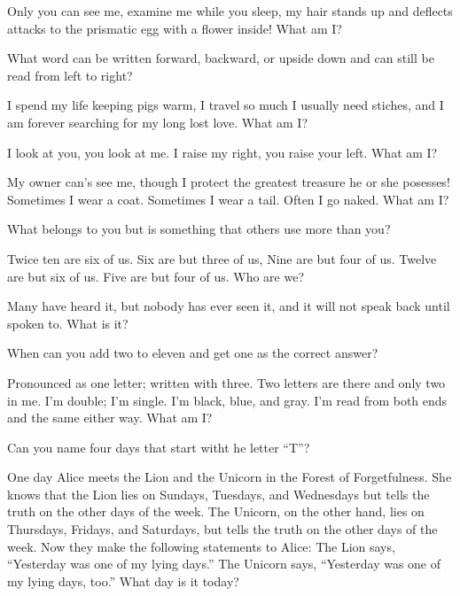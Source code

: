 \documentclass[green]{guildcamp2}
\begin{document}
\begin{enum}
	\item Only you can see me, examine me while you sleep, my hair stands up and deflects attacks to the prismatic egg with a flower inside! What am I?
	
	\item What word can be written forward, backward, or upside down and can still be read from left to right?
	
	\item I spend my life keeping pigs warm, I travel so much I usually need stiches, and I am forever searching for my long lost love. What am I?
	
	\item I look at you, you look at me. I raise my right, you raise your left. What am I?
	
	\item My owner can's see me, though I protect the greatest treasure he or she posesses! Sometimes I wear a coat. Sometimes I wear a tail. Often I go naked. What am I?
	
	\item What belongs to you but is something that others use more than you?
	
	\item Twice ten are six of us. Six are but three of us, Nine are but four of us. Twelve are but six of us. Five are but four of us. Who are we?
	
	\item Many have heard it, but nobody has ever seen it, and it will not speak back until spoken to. What is it?
	
	\item When can you add two to eleven and get one as the correct answer?
	
	\item Pronounced as one letter; written with three. Two letters are there and only two in me. I'm double; I'm single. I'm black, blue, and gray. I'm read from both ends and the same either way. What am I?
	
	\item Can you name four days that start witht he letter ``T''?
	
	\item One day Alice meets the Lion and the Unicorn in the Forest of Forgetfulness. She knows that the Lion lies on Sundays, Tuesdays, and Wednesdays but tells the truth on the other days of the week. The Unicorn, on the other hand, lies on Thursdays, Fridays, and Saturdays, but tells the truth on the other days of the week. Now they make the following statements to Alice:
The Lion says, ``Yesterday was one of my lying days.''
The Unicorn says, ``Yesterday was one of my lying days, too.''
What day is it today?


\end{enum}
\end{document}
